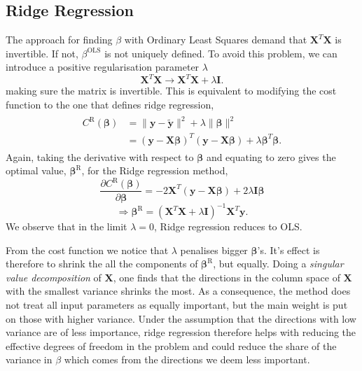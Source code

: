 \documentclass[a4paper, 
amsfonts, 
amssymb, 
amsmath, 
reprint, 
showkeys, 
nofootinbib, 
twoside]{revtex4-2}
\begin{document}
\subsection{Ridge Regression}

The approach for finding $\beta$ with Ordinary Least Squares demand that $\bm{X}^T \bm{X}$ is invertible. If not, $\beta^\textrm{OLS}$ is not uniquely defined. To avoid this problem, we can introduce a positive regularisation parameter $\lambda$
\begin{equation}
    \bm{X}^T\bm{X} \to \bm{X}^T\bm{X} + \lambda \bm{I}.
\end{equation}
making sure the matrix is invertible. This is equivalent to modifying the cost function to the one that defines ridge regression, \cite{Hoerl}
\begin{align}
\begin{split}
        C^{\textrm{R}}(\bm{\beta}) &= \lVert \bm{y} - \bm{\tilde{y}}\rVert^2 + \lambda \lVert \bm{\beta}\rVert^2 \\
        &= (\bm{y} - \bm{X\beta})^T(\bm{y} - \bm{X\beta}) + \lambda \bm{\beta}^T \bm{\beta}.
\end{split}
\label{eq:ridgecost}
\end{align}
Again, taking the derivative with respect to $\bm{\beta}$ and equating to zero gives the optimal value, $\bm{\beta}^{\textrm{R}}$, for the Ridge regression method,
\begin{equation}
   \frac{\partial C^{\textrm{R}}(\bm{\beta})}{\partial \bm{\beta}} = -2\bm{X}^T(\bm{y} - \bm{X\beta}) + 2 \lambda \bm{I} \bm{ \beta} 
\end{equation}
\begin{equation}
    \Rightarrow \bm{\beta}^{\textrm{R}} = (\bm{X}^T\bm{X} + \lambda\bm{I})^{-1}\bm{X}^T\bm{y}.
\end{equation}
We observe that in the limit $\lambda = 0$, Ridge regression reduces to OLS.

From the cost function we notice that $\lambda$ penalises bigger $\bm{\beta}$'s. It's effect is therefore to shrink the all the components of $\bm{\beta}^{\textrm{R}}$, but equally. Doing a \textit{singular value decomposition} of $\bm{X}$, one finds that the directions in the column space of $\bm{X}$ with the smallest variance shrinks the most. As a consequence, the method does not treat all input parameters as equally important, but the main weight is put on those with higher variance. Under the assumption that the directions with low variance are of less importance, ridge regression therefore helps with reducing the effective degrees of freedom in the problem and could reduce the share of the variance in $\beta$ which comes from the directions we deem less important.
\end{document}

